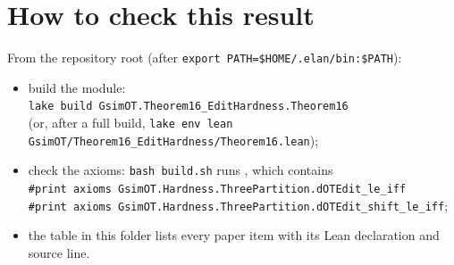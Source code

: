 \section{How to check this result}
From the repository root (after \texttt{export PATH=\$HOME/.elan/bin:\$PATH}):
\begin{itemize}
\item build the module:\\ \texttt{lake build GsimOT.Theorem16\_EditHardness.Theorem16}\\
  (or, after a full build, \texttt{lake env lean GsimOT/Theorem16\_EditHardness/Theorem16.lean});
\item check the axioms: \texttt{bash build.sh} runs , which contains\\
  \texttt{\#print axioms GsimOT.Hardness.ThreePartition.dOTEdit\_le\_iff}\\
  \texttt{\#print axioms GsimOT.Hardness.ThreePartition.dOTEdit\_shift\_le\_iff};
\item the table  in this folder lists every paper item with its Lean
  declaration and source line.
\end{itemize}

